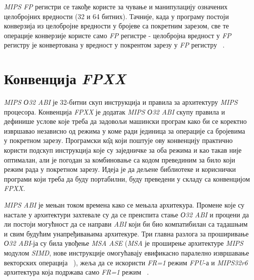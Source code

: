 \documentclass[12pt,oneside]{memoir}
\begin{document}
\indent \textit{MIPS FP} регистри се такође користе за чување и манипулацију означених целобројних вредности (32 и 64 битних). Тачније, када у програму постоји конверзија из целобројне вредности у бројеве са покретним зарезом, све те операције конверзије користе само \textit{FP} регистре - целобројна вредност у  \textit{FP} регистру је конвертована у вредност у покрентом зарезу у  \textit{FP} регистру ~\cite{SeeMIPSRun}.

\section{Конвенција \textit{FPXX}}
\label{sec_fpxx}

\indent \textit{MIPS О32 ABI} је 32-битни скуп инструкција и правила за архитектуру \textit{MIPS} процесора. Конвенција \textit{FPXX} је додатак \textit{MIPS О32 ABI} скупу правила и дефинише услове које треба да задовољи машински програм како би се коректно извршавао независно од режима у коме ради јединица за операције са бројевима у покретном зарезу. Програмски к\^{о}д који поштује ову конвенцију практично користи подскуп инструкција које су заједничке за оба режима и као такав није оптималан, али је погодан за комбиновање са кодом превединим за било који режим рада у покретном зарезу. Идеја је да дељене библиотеке и кориснички програми који треба да буду портабилни, буду преведени у складу са конвенцијом \textit{FPXX}.


\indent \textit{MIPS ABI} је мењан током времена како се мењала архитекура. Промене које су настале у архитектури захтевале су да се преиспита стање \textit{О32 ABI} и процени да ли постоји могућност да се направи \textit{ABI} који би био компатибилан са тадашњим и свим будућим унапређивањима архитекуре. Три главна разлога за проширивање \textit{О32 ABI}-ја су била увођење \textit{MSA ASE} (\textit{MSA} је проширење архитектуре \textit{MIPS} модулом \textit{SIMD}, нове инструкције омогућавају евификасно паралелно извршавање векторских операција ~\cite{MSA}), жеља да се искористи \textit{FR=1} режим \textit{FPU}-а и \textit{MIPS32r6} архитектура која подржава само \textit{FR=1} режим ~\cite{fpxxRef}.
\end{document}
